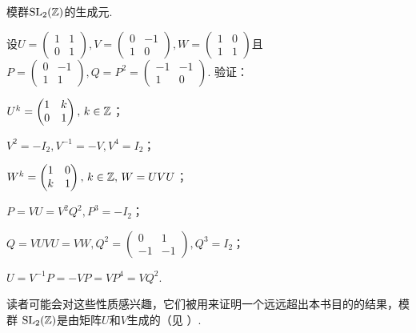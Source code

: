 \begin{problem}
  {\kaishu 模群$\operatorname{SL}_2(\mathbb Z)$的生成元.}

  设$U=\begin{pmatrix}
    1 & 1 \\
    0 & 1
  \end{pmatrix},V=\begin{pmatrix}
    0 & -1\\
    1 & 0
  \end{pmatrix},W=\begin{pmatrix}
    1 & 0 \\
    1 & 1
  \end{pmatrix}$且$P=\begin{pmatrix}
    0 & -1 \\
    1 & 1
  \end{pmatrix},Q=P^2=\begin{pmatrix}
    -1 & -1\\
    1 & 0
  \end{pmatrix}$. 验证：
  \begin{enum}
    \item $U^k=\begin{pmatrix}
      1 & k \\
      0 & 1
    \end{pmatrix},\,k\in\mathbb Z$；
    \item $V^2=-I_2,V^{-1}=-V,V^4=I_2$；
    \item $W^k=\begin{pmatrix}
      1 & 0 \\
      k & 1
    \end{pmatrix},\,k\in\mathbb Z,\,W=UVU$；
    \item $P=VU=V^2Q^2,P^3=-I_2$；
    \item $Q=VUVU=VW,Q^2=\begin{pmatrix}
      0 & 1\\
      -1 & -1
    \end{pmatrix},Q^3=I_2$；
    \item $U=V^{-1}P=-VP=VP^4=VQ^2$.
  \end{enum}

  读者可能会对这些性质感兴趣，它们被用来证明一个远远超出本书目的的结果，{\kaishu 模群} $\operatorname{SL}_2(\mathbb Z)$是由矩阵$U$和$V$生成的（见 \cite[Chapter 5]{43}）.
\end{problem}

